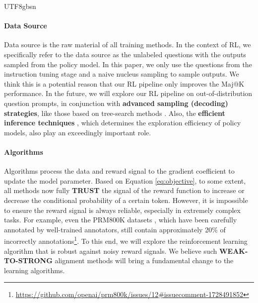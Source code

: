 \documentclass[11pt, a4paper, logo, copyright, nonumbering]{deepseek}
\begin{document}
\begin{CJK*}{UTF8}{gbsn}
\paragraph{Data Source} Data source is the raw material of all training methods.
In the context of RL, we specifically refer to the data source as the unlabeled questions with the outputs sampled from the policy model. In this paper, we only use the questions from the instruction tuning stage and a naive nucleus sampling to sample outputs. We think this is a potential reason that 
our RL pipeline only improves the Maj@K performance. In the future, we will explore our RL pipeline on out-of-distribution question prompts, in conjunction with \textbf{advanced sampling (decoding) strategies}, like those based on tree-search methods \citep{yao2023tree}.
Also, the  \textbf{efficient inference techniques} \citep{xia-etal-2023-speculative,leviathan2023fast,kwon2023efficient,xia2024unlocking}, which determines the exploration efficiency of policy models, also play an exceedingly important role.

\paragraph{Algorithms} Algorithms process the data and reward signal to the gradient coefficient to update the model parameter. 
Based on Equation \ref{eq:objective}, to some extent, all methods now fully \textbf{TRUST} the signal of the reward function to increase or decrease the conditional probability of a certain token.
However, it is impossible to ensure the reward signal is always reliable, especially in extremely complex tasks. For example, even the PRM800K datasets \citep{lightman2023let}, which have been carefully annotated by well-trained annotators, still contain approximately 20\% of incorrectly annotations\footnote{\url{https://github.com/openai/prm800k/issues/12\#issuecomment-1728491852}}. To this end, we will explore the reinforcement learning algorithm that is robust against noisy reward signals.  We believe such \textbf{WEAK-TO-STRONG} \citep{burns2023weak} alignment methods will bring a fundamental change to the learning algorithms.


\end{CJK*}
\end{document}

